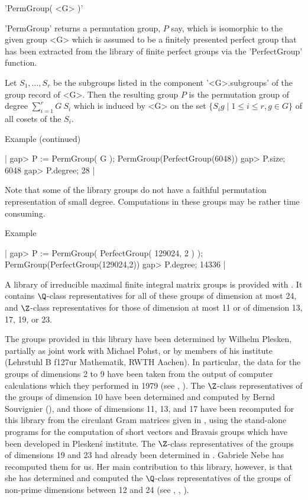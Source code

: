 \vspace{5mm}
'PermGroup( <G> )'%

'PermGroup' returns a permutation group, $P$  say, which is isomorphic to
the given group <G>  which is assumed  to be a finitely presented perfect
group  that  has been extracted from the library of finite perfect groups
via the 'PerfectGroup' function.

Let $S_1,   \ldots,  S_r$ be    the subgroups   listed in the   component
'<G>.subgroups' of the group record of  <G>. Then the resulting group $P$
is the permutation group of degree $\sum_{i=1}^{r} G \!\:\! S_i$ which is
induced by <G> on the set $\{ S_i g \mid 1 \leq i \leq  r, g \in G \}$ of
all cosets of the $S_i$.

Example (continued)\:

|    gap> P := PermGroup( G );
    PermGroup(PerfectGroup(6048))
    gap> P.size;
    6048
    gap> P.degree;
    28 |

Note that some of the  library groups do not  have a faithful permutation
representation of  small  degree.  Computations in  these groups  may  be
rather time consuming.

Example\:

|    gap> P := PermGroup( PerfectGroup( 129024, 2 ) );
    PermGroup(PerfectGroup(129024,2))
    gap> P.degree;
    14336 |

\newpage
{}%

A   library of irreducible   maximal finite   integral  matrix groups  is
provided with {\GAP}. It  contains $\Q$-class representatives for  all of
these groups of dimension at  most 24, and $\Z$-class representatives for
those of dimension at most 11 or of dimension 13, 17, 19, or 23.

The  groups  provided  in this  library  have been  determined by Wilhelm
Plesken, partially as joint work with Michael Pohst, or by members of his
institute (Lehrstuhl B f{\accent127u}r    Mathematik, RWTH  Aachen).   In
particular, the data for the groups of dimensions  2 to 9 have been taken
from the output  of computer  calculations which  they performed in  1979
(see   \cite{PP77}, \cite{PP80}). The  $\Z$-class  representatives of the
groups  of  dimension  10 have  been  determined and    computed by Bernd
Souvignier (\cite{Sou94}),  and those of  dimensions 11, 13,  and 17 have
been  recomputed for this library from  the circulant Gram matrices given
in  \cite{Ple85}, using the  stand-alone  programs for the computation of
short vectors and Bravais groups which have  been developed in Plesken\'s
institute. The $\Z$-class representatives of  the groups of dimensions 19
and  23 had already been  determined in  \cite{Ple85}.  Gabriele Nebe has
recomputed them  for us. Her  main contribution to this library, however,
is that she has determined and computed the $\Q$-class representatives of
the groups  of non-prime dimensions  between 12 and  24 (see \cite{PN95},
\cite{NP95}, \cite{Neb95}).

